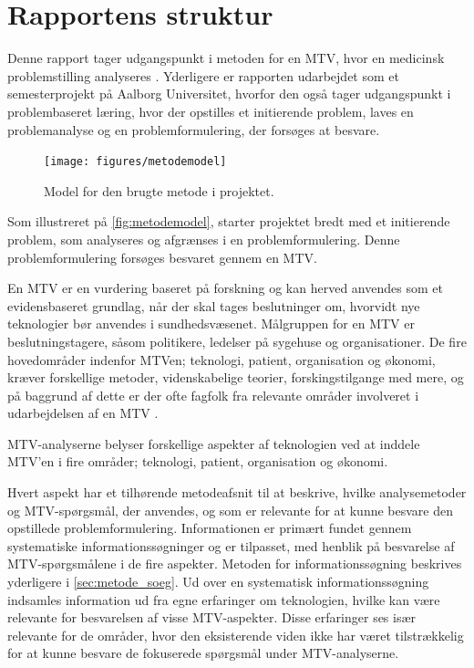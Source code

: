 \chapter{Rapportens struktur} \label{metode}
Denne rapport tager udgangspunkt i metoden for en MTV, hvor en medicinsk problemstilling analyseres \citep{mtvhaandbog}. Yderligere er rapporten udarbejdet som et semesterprojekt på Aalborg Universitet, hvorfor den også tager udgangspunkt i problembaseret læring, hvor der opstilles et initierende problem, laves en problemanalyse og en problemformulering, der forsøges at besvare. 

\begin{figure}[H]
	\centering
	\texttt{[image: figures/metodemodel]}
	\caption{Model for den brugte metode i projektet.}
	\label{fig:metodemodel}
\end{figure}

\noindent
Som illustreret på \autoref{fig:metodemodel}, starter projektet bredt med et initierende problem, som analyseres og afgrænses i en problemformulering. Denne problemformulering forsøges besvaret gennem en MTV. 

En MTV er en vurdering baseret på forskning og kan herved anvendes som et evidensbaseret grundlag, når der skal tages beslutninger om, hvorvidt nye teknologier bør anvendes i sundhedsvæsenet. Målgruppen for en MTV er beslutningstagere, såsom politikere, ledelser på sygehuse og organisationer. De fire hovedområder indenfor MTVen; teknologi, patient, organisation og økonomi, kræver forskellige metoder, videnskabelige teorier, forskingstilgange med mere, og på baggrund af dette er der ofte fagfolk fra relevante områder involveret i udarbejdelsen af en MTV \citep{mtvhaandbog}. 

MTV-analyserne belyser forskellige aspekter af teknologien ved at inddele MTV'en i fire områder; teknologi, patient, organisation og økonomi. 

Hvert aspekt har et tilhørende metodeafsnit til at beskrive, hvilke analysemetoder og MTV-spørgsmål, der anvendes, og som er relevante for at kunne besvare den opstillede problemformulering. Informationen er primært fundet gennem systematiske informationssøgninger og er tilpasset, med henblik på besvarelse af MTV-spørgsmålene i de fire aspekter. Metoden for informationssøgning beskrives yderligere i \autoref{sec:metode_soeg}. Ud over en systematisk informationssøgning indsamles information ud fra egne erfaringer om teknologien, hvilke kan være relevante for besvarelsen af visse MTV-aspekter. Disse erfaringer ses især relevante for de områder, hvor den eksisterende viden ikke har været tilstrækkelig for at kunne besvare de fokuserede spørgsmål under MTV-analyserne.

